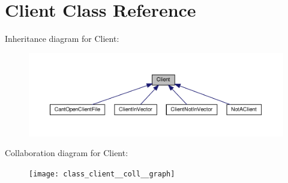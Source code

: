 \hypertarget{class_client}{}\section{Client Class Reference}
\label{class_client}


Inheritance diagram for Client\+:\nopagebreak
\begin{figure}[H]
\begin{center}
\leavevmode
\includegraphics[width=350pt]{class_client__inherit__graph}
\end{center}
\end{figure}


Collaboration diagram for Client\+:
\nopagebreak
\begin{figure}[H]
\begin{center}
\leavevmode
\texttt{[image: class\_client\_\_coll\_\_graph]}
\end{center}
\end{figure}
